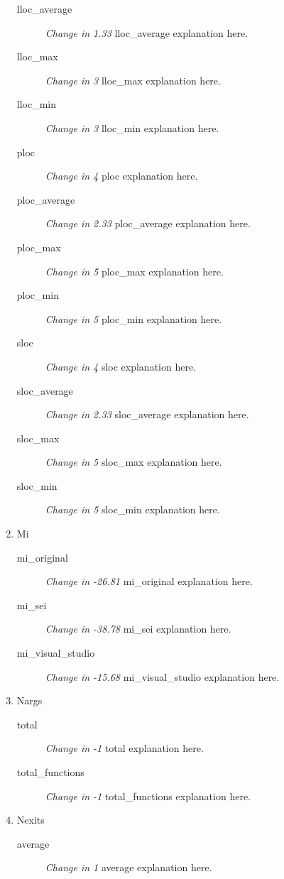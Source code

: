 \begin{enumerate}
\begin{description}
          \item [lloc\_average] \textit{Change in 1.33} lloc\_average explanation here.
          \item [lloc\_max] \textit{Change in 3} lloc\_max explanation here.
          \item [lloc\_min] \textit{Change in 3} lloc\_min explanation here.
          \item [ploc] \textit{Change in 4} ploc explanation here.
          \item [ploc\_average] \textit{Change in 2.33} ploc\_average explanation here.
          \item [ploc\_max] \textit{Change in 5} ploc\_max explanation here.
          \item [ploc\_min] \textit{Change in 5} ploc\_min explanation here.
          \item [sloc] \textit{Change in 4} sloc explanation here.
          \item [sloc\_average] \textit{Change in 2.33} sloc\_average explanation here.
          \item [sloc\_max] \textit{Change in 5} sloc\_max explanation here.
          \item [sloc\_min] \textit{Change in 5} sloc\_min explanation here.
        \end{description}
  \item Mi
        \begin{description}
          \item [mi\_original] \textit{Change in -26.81} mi\_original explanation here.
          \item [mi\_sei] \textit{Change in -38.78} mi\_sei explanation here.
          \item [mi\_visual\_studio] \textit{Change in -15.68} mi\_visual\_studio explanation here.
        \end{description}
  \item Nargs
        \begin{description}
          \item [total] \textit{Change in -1} total explanation here.
          \item [total\_functions] \textit{Change in -1} total\_functions explanation here.
        \end{description}
  \item Nexits
        \begin{description}
          \item [average] \textit{Change in 1} average explanation here.

\end{description}
\end{enumerate}
